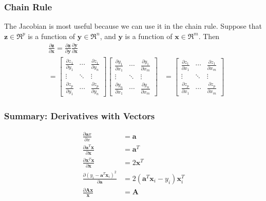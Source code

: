 \documentclass{beamer}
\begin{document}
\begin{frame}
  \frametitle{Chain Rule}

  The Jacobian is most useful because we can use it in the chain rule.
  Suppose that $\mathbf{z}\in\Re^p$ is a function of
  $\mathbf{y}\in\Re^n$, and $\mathbf{y}$ is a function of
  $\mathbf{x}\in\Re^m$.  Then
  \begin{align*}
    &\frac{\partial\mathbf{z}}{\partial\mathbf{x}}=
    \frac{\partial\mathbf{z}}{\partial\mathbf{y}}
    \frac{\partial\mathbf{y}}{\partial\mathbf{x}}\\
    &=
    \left[\begin{array}{ccc}
        \frac{\partial z_1}{\partial y_1} & \cdots & \frac{\partial z_1}{\partial y_n}\\
        \vdots&\ddots&\vdots\\
        \frac{\partial z_p}{\partial y_1} & \cdots & \frac{\partial z_p}{\partial y_n}
      \end{array}\right]
    \left[\begin{array}{ccc}
        \frac{\partial y_1}{\partial x_1} & \cdots & \frac{\partial y_1}{\partial x_m}\\
        \vdots&\ddots&\vdots\\
        \frac{\partial y_n}{\partial x_1} & \cdots & \frac{\partial y_n}{\partial x_m}
      \end{array}\right]
    &=
    \left[\begin{array}{ccc}
        \frac{\partial z_1}{\partial x_1} & \cdots & \frac{\partial z_1}{\partial x_m}\\
        \vdots&\ddots&\vdots\\
        \frac{\partial z_p}{\partial x_1} & \cdots & \frac{\partial z_p}{\partial x_m}
      \end{array}\right]
  \end{align*}
        
\end{frame}

\begin{frame}
  \frametitle{Summary: Derivatives with Vectors}
  \begin{align*}
    \frac{\partial\mathbf{a}x}{\partial x} &= \mathbf{a}\\
    \frac{\partial\mathbf{a}^T\mathbf{x}}{\partial\mathbf{x}} &= \mathbf{a}^T\\
    \frac{\partial\mathbf{x}^T\mathbf{x}}{\partial\mathbf{x}} &= 2\mathbf{x}^T\\
    \frac{\partial(y_i-\mathbf{a}^T\mathbf{x}_i)^2}{\partial\mathbf{a}}
    &= 2(\mathbf{a}^T\mathbf{x}_i-y_i)\mathbf{x}_i^T\\
    \frac{\partial\mathbf{A}\mathbf{x}}{\mathbf{x}}&= \mathbf{A}
  \end{align*}    
\end{frame}
\end{document}
